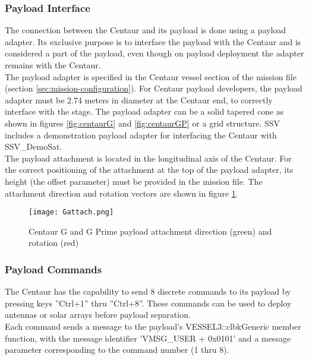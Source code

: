 \documentclass[Space_Shuttle_Vessel_Manual.tex]{subfiles}
\begin{document}
\begin{multicols*}{2}
\subsubsection{Payload Interface}
The connection between the Centaur and its payload is done using a payload adapter. Its exclusive purpose is to interface the payload with the Centaur and is considered a part of the payload, even though on payload deployment the adapter remains with the Centaur.\\
The payload adapter is specified in the Centaur vessel section of the mission file (section \ref{sec:mission-configuration}).
For Centaur payload developers, the payload adapter must be 2.74 meters in diameter at the Centaur end, to correctly interface with the stage. The payload adapter can be a solid tapered cone as shown in figures \ref{fig:centaurG} and \ref{fig:centaurGP} or a grid structure. SSV includes a demonstration payload adapter for interfacing the Centaur with SSV\_DemoSat.
\\
The payload attachment is located in the longitudinal axis of the Centaur. For the correct positioning of the attachment at the top of the payload adapter, its height (the offset parameter) must be provided in the mission file. The attachment direction and rotation vectors are shown in figure \ref{fig:Gattach}.

\begin{figure}[H]
  \centering
  \captionsetup{justification=centering}
  \texttt{[image: Gattach.png]}
  \caption{Centaur G and G Prime payload attachment direction (green) and rotation (red)}
  \label{fig:Gattach}
\end{figure}

\subsubsection{Payload Commands}
The Centaur has the capability to send 8 discrete commands to its payload by pressing keys ''Ctrl+1'' thru ''Ctrl+8''. These commands can be used to deploy antennas or solar arrays before payload separation.
\\
Each command sends a message to the payload's VESSEL3::clbkGeneric member function, with the message identifier 'VMSG\_USER + 0x0101' and a message parameter corresponding to the command number (1 thru 8).\\

\end{multicols*}
\end{document}
